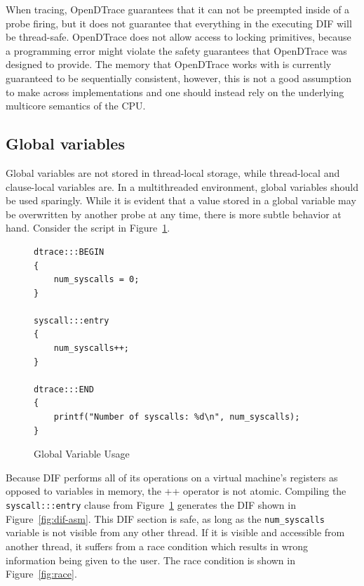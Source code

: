 %

When tracing, OpenDTrace guarantees that it can not be preempted
inside of a probe firing, but it does not guarantee that everything
in the executing DIF will be thread-safe. OpenDTrace does not allow
access to locking primitives, because a programming error might violate
the safety guarantees that OpenDTrace was designed to provide.
The memory that OpenDTrace works with is currently guaranteed to be
sequentially consistent, however, this is not a good assumption to make
across implementations and one should instead rely on the underlying
multicore semantics of the CPU.

\subsection{Global variables}

Global variables are not stored in thread-local storage, while
thread-local and clause-local variables are. In a multithreaded
environment, global variables should be used sparingly. While it is
evident that a value stored in a global variable may be overwritten by
another probe at any time, there is more subtle behavior at
hand. Consider the script in Figure~\ref{fig:global-var-usage}. \newline

\begin{figure}
  \begin{lstlisting}
dtrace:::BEGIN
{
    num_syscalls = 0;
}

syscall:::entry
{
    num_syscalls++;
}

dtrace:::END
{
    printf("Number of syscalls: %d\n", num_syscalls);
}
  \end{lstlisting}
  \caption{Global Variable Usage}
  \label{fig:global-var-usage}
\end{figure}

\noindent
Because DIF performs all of its operations on a virtual machine's
registers as opposed to variables in memory, the ++ operator is not
atomic. Compiling the \texttt{syscall:::entry} clause from
Figure~\ref{fig:global-var-usage} generates the DIF shown in
Figure~\ref{fig:dif-asm}.  This DIF section is safe, as long as the
\texttt{num\_syscalls} variable is not visible from any other thread. If it is
visible and accessible from another thread, it suffers from a race
condition which results in wrong information being given to the
user. The race condition is shown in Figure~\ref{fig:race}. \newline

